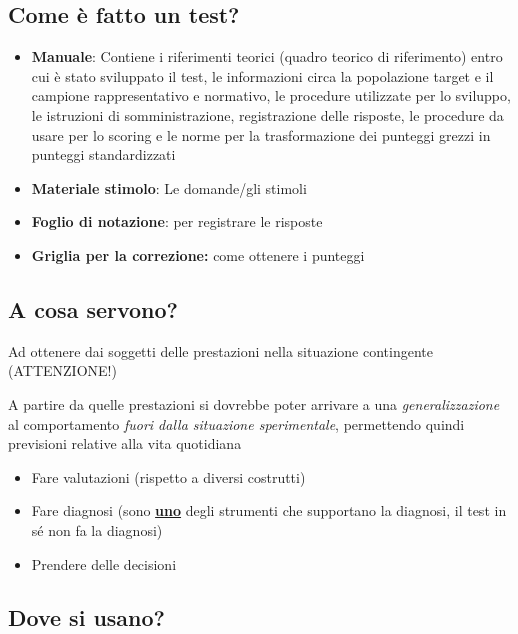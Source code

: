 \documentclass[compress]{beamer}
\begin{document}
\subsection{Come è fatto un test?}

\begin{frame}
	\begin{itemize}
		\item \textbf{Manuale}: Contiene i riferimenti teorici (quadro teorico di riferimento) entro cui è stato sviluppato il test, le informazioni circa la popolazione target e il campione rappresentativo e normativo, le procedure utilizzate per lo sviluppo, le istruzioni di somministrazione, registrazione delle risposte, le procedure da usare per lo scoring e le norme per la trasformazione dei punteggi grezzi in punteggi standardizzati
		\item \textbf{Materiale stimolo}: Le domande/gli stimoli
		\item \textbf{Foglio di notazione}: per registrare le risposte
		\item \textbf{Griglia per la correzione:} come ottenere i punteggi
	\end{itemize}
\end{frame}

\subsection{A cosa servono?}

\begin{frame}
	Ad ottenere dai soggetti delle prestazioni nella situazione contingente (ATTENZIONE!)
	
	\bigskip
	
	A partire da quelle prestazioni si dovrebbe poter arrivare a una \emph{generalizzazione} al comportamento \emph{fuori dalla situazione sperimentale}, permettendo quindi previsioni relative alla vita quotidiana
	
	\bigskip
	\begin{itemize}
		\item 	Fare valutazioni (rispetto a diversi costrutti)
		\item Fare diagnosi (sono \underline{\textbf{uno}} degli strumenti che supportano la diagnosi, il test in sé non fa la diagnosi)
		\item Prendere delle decisioni
	\end{itemize}		
\end{frame}

\subsection{Dove si usano?}
\end{document}

